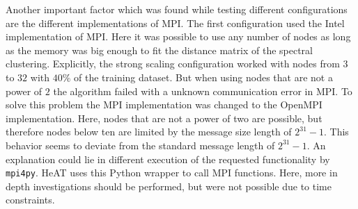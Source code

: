Another important factor which was found while testing different configurations are the different implementations of \gls{MPI}.
The first configuration used the Intel implementation of \gls{MPI}. Here it was possible to use any number of nodes as long as
the memory was big enough to fit the distance matrix of the spectral clustering. Explicitly, the strong scaling configuration worked
with nodes from \(3\) to \(32\) with \(40\%\) of the training dataset.
But when using nodes that are not a power of \(2\) the algorithm failed with a unknown communication error in \gls{MPI}.
To solve this problem the \gls{MPI} implementation was changed to the OpenMPI implementation.
Here, nodes that are not a power of two are possible, but therefore nodes below ten are limited by the message size length of \(2^{31} - 1\).
This behavior seems to deviate from the standard message length of \(2^{31} - 1\).
An explanation could lie in different execution of the requested functionality by \lstinline{mpi4py}.
\gls{HeAT} uses this Python wrapper to call \gls{MPI} functions.
Here, more in depth investigations should be performed, but were not possible due to time constraints.

